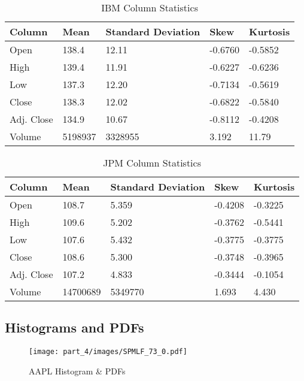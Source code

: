 \begin{table}[h]
    \centering
    \begin{tabular}{l|l|l|l|l}
    Column     & Mean     & Standard Deviation  & Skew    & Kurtosis  \\ \hline
    Open       & 138.4    & 12.11               & -0.6760 & -0.5852   \\ 
    High       & 139.4    & 11.91               & -0.6227 & -0.6236  \\ 
    Low        & 137.3    & 12.20               & -0.7134 & -0.5619  \\ 
    Close      & 138.3    & 12.02               & -0.6822 & -0.5840  \\ 
    Adj. Close & 134.9    & 10.67               & -0.8112 & -0.4208 \\
    Volume     & 5198937 & 3328955           & 3.192  & 11.79   
    \end{tabular}
    \caption{IBM Column Statistics}
    \label{table:part_4:IBM_stats}
\end{table}

\begin{table}[h]
    \centering
    \begin{tabular}{l|l|l|l|l}
    Column     & Mean     & Standard Deviation  & Skew    & Kurtosis  \\ \hline
    Open       & 108.7    & 5.359               & -0.4208 & -0.3225   \\ 
    High       & 109.6    & 5.202               & -0.3762 & -0.5441  \\ 
    Low        & 107.6    & 5.432               & -0.3775 & -0.3775  \\ 
    Close      & 108.6    & 5.300               & -0.3748 & -0.3965  \\ 
    Adj. Close & 107.2    & 4.833               & -0.3444 & -0.1054 \\
    Volume     & 14700689 & 5349770           & 1.693  & 4.430  
    \end{tabular}
    \caption{JPM Column Statistics}
    \label{table:part_4:JPM_stats}
\end{table}


\subsection{Histograms and PDFs}

\begin{figure}[!htb]
    \centering
    \texttt{[image: part\_4/images/SPMLF\_73\_0.pdf]}
    \caption{AAPL Histogram \& PDFs}
    \label{fig:part_4:aapl_pdf}
\end{figure}

